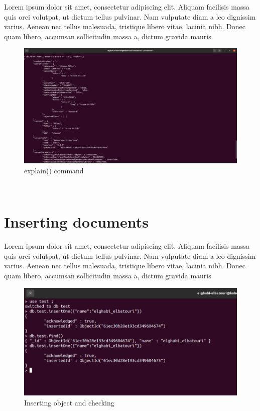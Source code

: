 \begin{spacing}{1.2}
\par Lorem ipsum dolor sit amet, consectetur adipiscing elit. Aliquam facilisis massa quis orci volutpat, ut dictum tellus pulvinar. Nam vulputate diam a leo dignissim varius. Aenean nec tellus malesuada, tristique libero vitae, lacinia nibh. Donec quam libero, accumsan sollicitudin massa a, dictum gravida mauris
\\
\begin{figure}[!htb] 
\begin{center} 
\includegraphics[width=1\linewidth]{Pictures/MongoDB/Examining MongoDB Query Features/Index management/explain() command} 
\end{center} 
\caption{explain() command} 
\end{figure}  \FloatBarrier
\\
\section{Inserting documents }
\par Lorem ipsum dolor sit amet, consectetur adipiscing elit. Aliquam facilisis massa quis orci volutpat, ut dictum tellus pulvinar. Nam vulputate diam a leo dignissim varius. Aenean nec tellus malesuada, tristique libero vitae, lacinia nibh. Donec quam libero, accumsan sollicitudin massa a, dictum gravida mauris
\\
\begin{figure}[!htb] 
\begin{center} 
\includegraphics[width=1\linewidth]{Pictures/MongoDB/Examining MongoDB Query Features/Inserting documents/Inserting object and checking} 
\end{center} 
\caption{Inserting object and checking} 
\end{figure}  \FloatBarrier
\\


\end{spacing}
